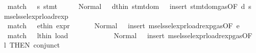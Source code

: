 \begin{isabellebody}
\ \ match\ \ \ s{\isacharcolon}{\kern0pt}\ {\isachardoublequoteopen}stmt\ {\isacharunderscore}{\kern0pt}\ {\isacharunderscore}{\kern0pt}\ {\isacharunderscore}{\kern0pt}\ {\isacharunderscore}{\kern0pt}\ {\isacharequal}{\kern0pt}\ Normal\ {\isacharparenleft}{\kern0pt}{\isacharunderscore}{\kern0pt}{\isacharcomma}{\kern0pt}{\isacharunderscore}{\kern0pt}{\isacharparenright}{\kern0pt}{\isachardoublequoteclose}\ \ d{\isacharbrackleft}{\kern0pt}thin{\isacharbrackright}{\kern0pt}{\isacharcolon}{\kern0pt}\ {\isachardoublequoteopen}stmt{\isacharunderscore}{\kern0pt}dom\ {\isacharunderscore}{\kern0pt}{\isachardoublequoteclose}\ {\isasymRightarrow}\ {\isacartoucheopen}insert\ stmt{\isacharunderscore}{\kern0pt}dom{\isacharunderscore}{\kern0pt}gas{\isacharbrackleft}{\kern0pt}OF\ d\ s{\isacharbrackright}{\kern0pt}{\isacartoucheclose}\isanewline
{}\isamarkupfalse%
\ msel{\isacharunderscore}{\kern0pt}ssel{\isacharunderscore}{\kern0pt}expr{\isacharunderscore}{\kern0pt}load{\isacharunderscore}{\kern0pt}rexp\ {\isacharequal}{\kern0pt}\isanewline
\ \ match\ \ \ e{\isacharbrackleft}{\kern0pt}thin{\isacharbrackright}{\kern0pt}{\isacharcolon}{\kern0pt}\ {\isachardoublequoteopen}expr\ {\isacharunderscore}{\kern0pt}\ {\isacharunderscore}{\kern0pt}\ {\isacharunderscore}{\kern0pt}\ {\isacharunderscore}{\kern0pt}\ {\isacharunderscore}{\kern0pt}\ {\isacharequal}{\kern0pt}\ Normal\ {\isacharparenleft}{\kern0pt}{\isacharunderscore}{\kern0pt}{\isacharcomma}{\kern0pt}{\isacharunderscore}{\kern0pt}{\isacharparenright}{\kern0pt}{\isachardoublequoteclose}\ {\isasymRightarrow}\ {\isacartoucheopen}insert\ msel{\isacharunderscore}{\kern0pt}ssel{\isacharunderscore}{\kern0pt}expr{\isacharunderscore}{\kern0pt}load{\isacharunderscore}{\kern0pt}rexp{\isacharunderscore}{\kern0pt}gas{\isacharparenleft}{\kern0pt}{}{\isacharparenright}{\kern0pt}{\isacharbrackleft}{\kern0pt}OF\ e{\isacharbrackright}{\kern0pt}{\isacartoucheclose}\ {\isacharbar}{\kern0pt}\isanewline
\ \ match\ \ \ l{\isacharbrackleft}{\kern0pt}thin{\isacharbrackright}{\kern0pt}{\isacharcolon}{\kern0pt}\ {\isachardoublequoteopen}load\ {\isacharunderscore}{\kern0pt}\ {\isacharunderscore}{\kern0pt}\ {\isacharunderscore}{\kern0pt}\ {\isacharunderscore}{\kern0pt}\ {\isacharunderscore}{\kern0pt}\ {\isacharunderscore}{\kern0pt}\ {\isacharunderscore}{\kern0pt}\ {\isacharunderscore}{\kern0pt}\ {\isacharunderscore}{\kern0pt}\ {\isacharunderscore}{\kern0pt}\ {\isacharunderscore}{\kern0pt}\ {\isacharequal}{\kern0pt}\ Normal\ {\isacharparenleft}{\kern0pt}{\isacharunderscore}{\kern0pt}{\isacharcomma}{\kern0pt}{\isacharunderscore}{\kern0pt}{\isacharparenright}{\kern0pt}{\isachardoublequoteclose}\ {\isasymRightarrow}\ {\isacartoucheopen}insert\ msel{\isacharunderscore}{\kern0pt}ssel{\isacharunderscore}{\kern0pt}expr{\isacharunderscore}{\kern0pt}load{\isacharunderscore}{\kern0pt}rexp{\isacharunderscore}{\kern0pt}gas{\isacharparenleft}{\kern0pt}{}{\isacharparenright}{\kern0pt}{\isacharbrackleft}{\kern0pt}OF\ l{\isacharcomma}{\kern0pt}\ THEN\ conjunct{}{\isacharbrackright}{\kern0pt}{\isacartoucheclose}\isanewline

\end{isabellebody}
